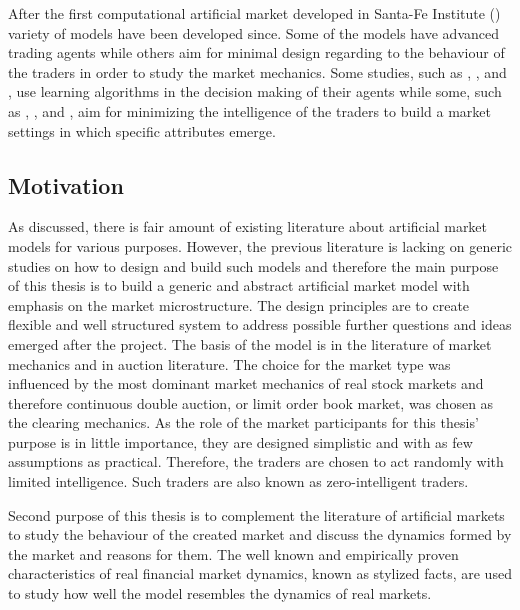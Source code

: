 After the first computational artificial market developed in Santa-Fe Institute
(\citet{SantaFe94}) variety of models have been developed since. Some of the
models have advanced trading agents while others aim for minimal design 
regarding to the behaviour of the traders in order to study the market
mechanics. Some studies, such as \citet{GOYKHMAN20181729}, \citet{IZUMI200535},
\citet{Reinforcement09} and \citet{YEH20102089}, use learning algorithms in the decision making of 
their agents while some, such as \citet{God93}, \citet{Jam96}, \citet{Genoa01} and \citet{Raberto05}, 
aim for minimizing the intelligence of the traders to build a market settings in which
specific attributes emerge. %


\subsection{Motivation}

As discussed, there is fair amount of existing literature about artificial market models for various
purposes. However, the previous literature is lacking on generic studies on how to design
and build such models and therefore the main purpose of this thesis is to build a generic and abstract 
artificial market model with emphasis on the market microstructure. The design principles are to create flexible 
and well structured system to address possible further questions and ideas emerged after the project. 
The basis of the model is in the literature of market mechanics and in auction literature. The choice for the
market type was influenced by the most dominant market mechanics of real stock markets and therefore
continuous double auction, or limit order book market, was chosen as the clearing mechanics. As the 
role of the market participants for this thesis' purpose is in little importance, they are designed
simplistic and with as few assumptions as practical. Therefore, the traders are chosen to act randomly
with limited intelligence. Such traders are also known as zero-intelligent traders. 

Second purpose of this thesis is to complement the literature of artificial markets to study 
the behaviour of the created market and discuss the dynamics formed by the market and reasons for them.
The well known and empirically proven characteristics of real financial market dynamics, known as 
stylized facts, are used to study how well the model resembles the dynamics of real markets.

